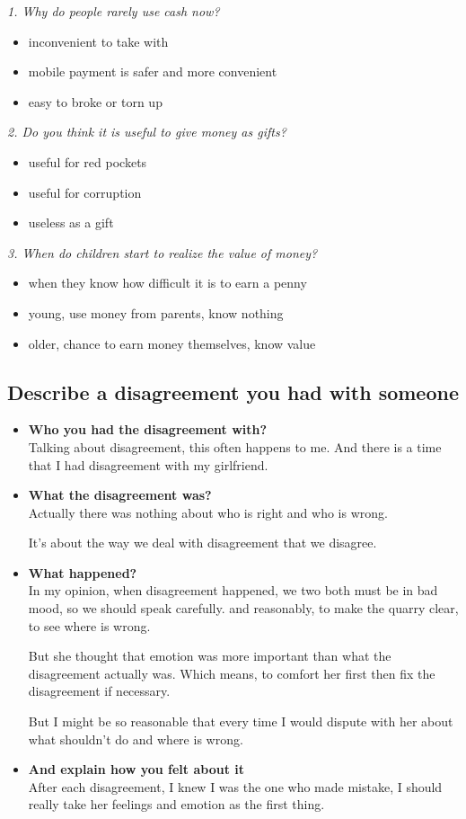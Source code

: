\documentclass[conference]{IEEEtran}
\begin{document}
\textit{1. Why do people rarely use cash now?}
\begin{itemize}
    \item inconvenient to take with
    \item mobile payment is safer and more convenient
    \item easy to broke or torn up
\end{itemize}

\textit{2. Do you think it is useful to give money as gifts?}
\begin{itemize}
    \item useful for red pockets
    \item useful for corruption
    \item useless as a gift
\end{itemize}

\textit{3. When do children start to realize the value of money?}
\begin{itemize}
    \item when they know how difficult it is to earn a penny
    \item young, use money from parents, know nothing
    \item older, chance to earn money themselves, know value
\end{itemize}

\subsection{Describe a disagreement you had with someone}
\begin{itemize}
    \item \textbf{Who you had the disagreement with?}\\
    Talking about disagreement, this often happens to me. And there is a time that I had disagreement with my girlfriend.
    \item \textbf{What the disagreement was?}\\
    Actually there was nothing about who is right and who is wrong.

    It's about the way we deal with disagreement that we disagree.
    \item \textbf{What happened?}\\
    In my opinion, when disagreement happened, we two both must be in bad mood, so we should speak carefully.
    and reasonably, to make the quarry clear, to see where is wrong.

    But she thought that emotion was more important than what the disagreement actually was.
    Which means, to comfort her first then fix the disagreement if necessary.

    But I might be so reasonable that every time I would dispute with her about what shouldn't do and where is wrong.
    \item \textbf{And explain how you felt about it}\\
    After each disagreement, I knew I was the one who made mistake, I should really take her feelings and emotion as the first thing.

\end{itemize}
\end{document}
